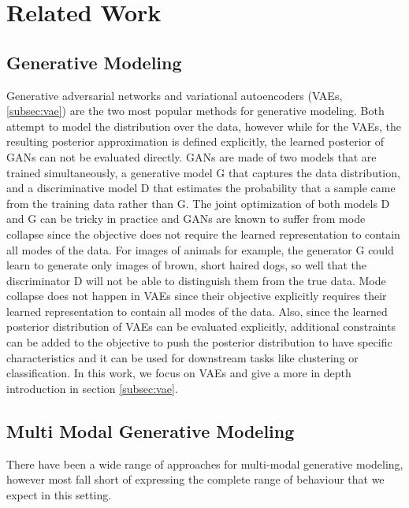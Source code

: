 \chapter{Related Work}
\section{Generative Modeling}
Generative adversarial networks \citep[GANs]{goodfellow_generative_2014} and variational autoencoders (VAEs, \cref{subsec:vae}) are the two most popular methods for generative modeling.
Both attempt to model the distribution over the data, however while for the VAEs, the resulting posterior approximation is defined explicitly, the learned posterior of GANs can not be evaluated directly.
GANs are made of two models that are trained simultaneously, a generative model G that captures the data distribution, and a discriminative model D that estimates the probability that a sample came from the training data rather than G.
The joint optimization of both models D and G can be tricky in practice and GANs are known to suffer from mode collapse since the objective does not require the learned representation to contain all modes of the data.
For images of animals for example, the generator G could learn to generate only images of brown, short haired dogs, so well that the discriminator D will not be able to distinguish them from the true data.
Mode collapse does not happen in VAEs since their objective explicitly requires their learned representation to contain all modes of the data.
Also, since the learned posterior distribution of VAEs can be evaluated explicitly, additional constraints can be added to the objective to push the posterior distribution to have specific characteristics and it can be used for downstream tasks like clustering or classification.
In this work, we focus on VAEs and give a more in depth introduction in section \cref{subsec:vae}.

\section{Multi Modal Generative Modeling}

There have been a wide range of approaches for multi-modal generative modeling, however most fall short of expressing the complete range of behaviour that we expect in this setting.

